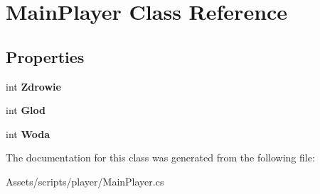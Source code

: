 \hypertarget{class_main_player}{}\section{Main\+Player Class Reference}
\label{class_main_player}
\subsection*{Properties}
\begin{DoxyCompactItemize}
\item 
\mbox{\label{class_main_player_a40d6a53016917b2b7e5068a28656c2d7}} 
int {\bfseries Zdrowie}
\item 
\mbox{\label{class_main_player_a070928205b9aed8e06ab9db12784ed50}} 
int {\bfseries Glod}
\item 
\mbox{\label{class_main_player_aa3daa6c7d588f4020478fa6d701137db}} 
int {\bfseries Woda}
\end{DoxyCompactItemize}


The documentation for this class was generated from the following file\+:\begin{DoxyCompactItemize}
\item 
Assets/scripts/player/Main\+Player.\+cs\end{DoxyCompactItemize}
